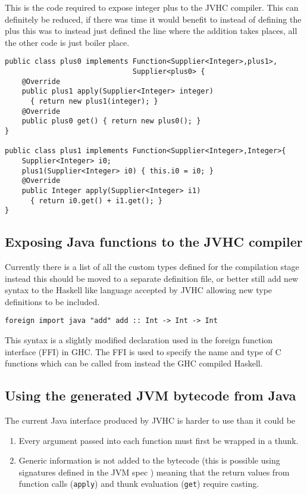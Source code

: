 \documentclass[float=false, crop=false]{standalone}
\begin{document}
This is the code required to expose integer plus to the JVHC compiler. 
This can definitely be reduced, if there was time it would benefit to instead of defining the plus
this was to instead just defined the line where the addition takes places, all
the other code is just boiler place.

\begin{verbatim}
public class plus0 implements Function<Supplier<Integer>,plus1>, 
                              Supplier<plus0> {
    @Override
    public plus1 apply(Supplier<Integer> integer) 
      { return new plus1(integer); }
    @Override
    public plus0 get() { return new plus0(); }
}

public class plus1 implements Function<Supplier<Integer>,Integer>{
    Supplier<Integer> i0;
    plus1(Supplier<Integer> i0) { this.i0 = i0; }
    @Override
    public Integer apply(Supplier<Integer> i1) 
      { return i0.get() + i1.get(); }
}
\end{verbatim}

\subsection{Exposing Java functions to the JVHC compiler}

Currently there is a list of all the custom types defined for the compilation stage
instead this should be moved to a separate definition file, or better still 
add new syntax to the Haskell like language accepted by JVHC allowing new type
definitions to be included.

\begin{verbatim}
foreign import java "add" add :: Int -> Int -> Int
\end{verbatim}

This syntax is a slightly modified declaration used in the foreign function interface (FFI) \cite{ghc_ffi} 
in GHC. The FFI is used to specify the name and type of C functions which can be called from 
instead the GHC compiled Haskell.

\subsection{Using the generated JVM bytecode from Java}

The current Java interface produced by JVHC is harder to use than it could be
\begin{enumerate}
  \item Every argument passed into each function must first be wrapped in a thunk. 
  \item Generic information is not added to the bytecode (this is possible using 
signatures defined in the JVM spec \cite[.9]{jvm-spec8}) meaning that
the return values from function calls (\texttt{apply}) and thunk evaluation (\texttt{get}) require casting.
\end{enumerate}
\end{document}
